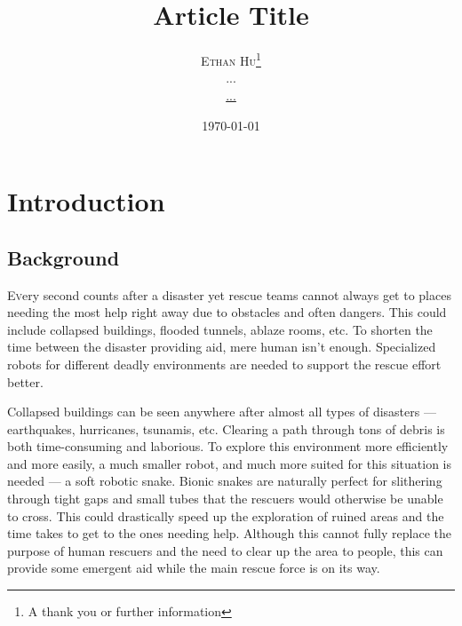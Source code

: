 \documentclass[twoside]{article}
\title{Article Title} %
\author{%
\textsc{Ethan Hu}\thanks{A thank you or further information} \\[1ex] %
\normalsize ... \\ %
\normalsize \href{mailto:...}{...} %
}
\date{\today} %
\begin{document}
\maketitle


\section{Introduction}
\subsection{Background}
\lettrine[nindent=0em,lines=3]{E} very second counts after a disaster yet rescue teams cannot always get to places needing the most help right away due to obstacles and often dangers. This could include collapsed buildings, flooded tunnels, ablaze rooms, etc. To shorten the time between the disaster providing aid, mere human isn't enough. Specialized robots for different deadly environments are needed to support the rescue effort better. 

Collapsed buildings can be seen anywhere after almost all types of disasters — earthquakes, hurricanes, tsunamis, etc. Clearing a path through tons of debris is both time-consuming and laborious. To explore this environment more efficiently and more easily, a much smaller robot, and much more suited for this situation is needed — a soft robotic snake. Bionic snakes are naturally perfect for slithering through tight gaps and small tubes that the rescuers would otherwise be unable to cross. This could drastically speed up the exploration of ruined areas and the time takes to get to the ones needing help. Although this cannot fully replace the purpose of human rescuers and the need to clear up the area to people, this can provide some emergent aid while the main rescue force is on its way. 
\end{document}
